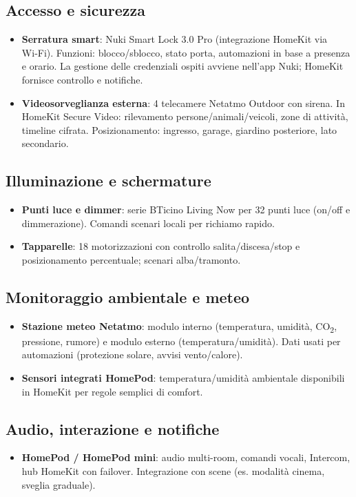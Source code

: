 \subsection*{Accesso e sicurezza}
\begin{itemize}
  \item \textbf{Serratura smart}: Nuki Smart Lock 3.0 Pro (integrazione HomeKit via Wi‑Fi). Funzioni: blocco/sblocco, stato porta, automazioni in base a presenza e orario. La gestione delle credenziali ospiti avviene nell’app Nuki; HomeKit fornisce controllo e notifiche.
  \item \textbf{Videosorveglianza esterna}: 4 telecamere Netatmo Outdoor con sirena. In HomeKit Secure Video: rilevamento persone/animali/veicoli, zone di attività, timeline cifrata. Posizionamento: ingresso, garage, giardino posteriore, lato secondario.
\end{itemize}

\subsection*{Illuminazione e schermature}
\begin{itemize}
  \item \textbf{Punti luce e dimmer}: serie BTicino Living Now per 32 punti luce (on/off e dimmerazione). Comandi scenari locali per richiamo rapido.
  \item \textbf{Tapparelle}: 18 motorizzazioni con controllo salita/discesa/stop e posizionamento percentuale; scenari alba/tramonto.
\end{itemize}

\subsection*{Monitoraggio ambientale e meteo}
\begin{itemize}
  \item \textbf{Stazione meteo Netatmo}: modulo interno (temperatura, umidità, CO\textsubscript{2}, pressione, rumore) e modulo esterno (temperatura/umidità). Dati usati per automazioni (protezione solare, avvisi vento/calore).
  \item \textbf{Sensori integrati HomePod}: temperatura/umidità ambientale disponibili in HomeKit per regole semplici di comfort.
\end{itemize}

\subsection*{Audio, interazione e notifiche}
\begin{itemize}
  \item \textbf{HomePod / HomePod mini}: audio multi-room, comandi vocali, Intercom, hub HomeKit con failover. Integrazione con scene (es. modalità cinema, sveglia graduale).
\end{itemize}

